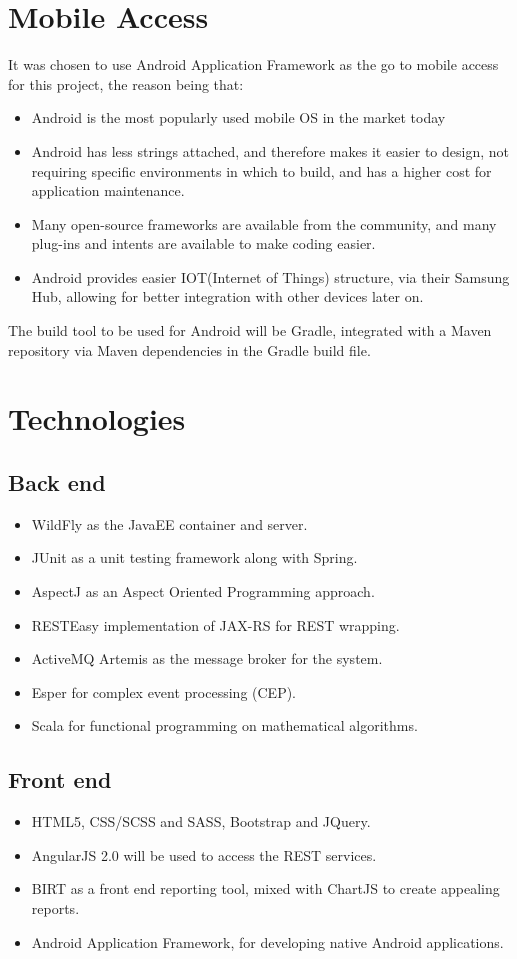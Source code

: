 \documentclass[11pt,a4paper]{article}
\begin{document}
\section{Mobile Access}
It was chosen to use Android Application Framework as the go to mobile access for this project, the reason being that:
\begin{itemize}
	\item Android is the most popularly used mobile OS in the market today
	\item Android has less strings attached, and therefore makes it easier to design, not requiring specific environments in which to build, and has a higher cost for application maintenance.
	\item Many open-source frameworks are available from the community, and many plug-ins and intents are available to make coding easier.
	\item Android provides easier IOT(Internet of Things) structure, via their Samsung Hub, allowing for better integration with other devices later on.\\
\end{itemize}
The build tool to be used for Android will be Gradle, integrated with a Maven repository via Maven dependencies in the Gradle build file.

\pagebreak
	
\section{Technologies}
\subsection{Back end}
\begin{itemize}
	\item WildFly as the JavaEE container and server.
	\item JUnit as a unit testing framework along with Spring.
	\item AspectJ as an Aspect Oriented Programming approach.
	\item RESTEasy implementation of JAX-RS for REST wrapping.
	\item ActiveMQ Artemis as the message broker for the system.
	\item Esper for complex event processing (CEP).
	\item Scala for functional programming on mathematical algorithms.
\end{itemize}
\subsection{Front end}
\begin{itemize}
	\item HTML5, CSS/SCSS and SASS, Bootstrap and JQuery.
	\item AngularJS 2.0 will be used to access the REST services.
	\item BIRT as a front end reporting tool, mixed with ChartJS to create appealing reports.
	\item Android Application Framework, for developing native Android applications.
\end{itemize}
\end{document}
